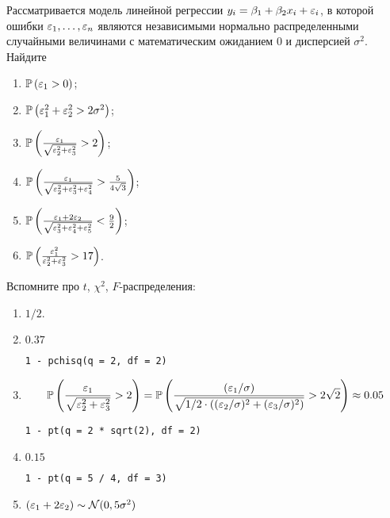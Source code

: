 \begin{problem}
Рассматривается модель линейной регрессии $y_i = \beta_1 + \beta_2 x_i + \varepsilon_i$, в которой ошибки $\varepsilon_1, \ldots, \varepsilon_n$ являются независимыми нормально распределенными случайными величинами с математическим ожиданием $0$ и дисперсией $\sigma^2$. Найдите

\begin{enumerate}
  \item $\mathbb{P}\left(\varepsilon_1 > 0\right)$;
  \item $\mathbb{P}\left(\varepsilon_1^2 + \varepsilon_2^2 > 2\sigma^2\right)$;
  \item $\mathbb{P}\left(\frac{\varepsilon_1}{\sqrt{\varepsilon_2^2 + \varepsilon_3^2}} > 2 \right)$;
  \item $\mathbb{P}\left(\frac{\varepsilon_1}{\sqrt{\varepsilon_2^2 + \varepsilon_3^2 + \varepsilon_4^2}} > \frac{5}{4\sqrt{3}} \right)$;
  \item $\mathbb{P}\left(\frac{\varepsilon_1 + 2\varepsilon_2}{\sqrt{\varepsilon_3^2 + \varepsilon_4^2 + \varepsilon_5^2}} < \frac{9}{2} \right)$;
  \item $\mathbb{P}\left(\frac{\varepsilon_1^2}{\varepsilon_2^2 + \varepsilon_3^2} > 17 \right)$.
\end{enumerate}


\begin{sol}
Вспомните про $t$, $\chi^2$, $F$-распределения:
\begin{enumerate}
\item \(1/2\).
\item $0.37$


\begin{verbatim}
1 - pchisq(q = 2, df = 2)
\end{verbatim}
\item \[\mathbb{P}\left(\frac{\varepsilon_1}{\sqrt{\varepsilon_2^2 + \varepsilon_3^2}} > 2 \right) =  \mathbb{P}\left(\frac{(\varepsilon_1/\sigma)}{\sqrt{1/2 \cdot \left((\varepsilon_2/\sigma)^2 + (\varepsilon_3/\sigma)^2\right)}} > 2\sqrt{2} \right) \approx 0.05
\]

\begin{verbatim}
1 - pt(q = 2 * sqrt(2), df = 2)
\end{verbatim}
\item $0.15$

\begin{verbatim}
1 - pt(q = 5 / 4, df = 3)
\end{verbatim}
\item \(\left(\varepsilon_1 + 2\varepsilon_2\right) \sim \mathcal{N}(0, 5\sigma^2)  \)


\end{enumerate}
\end{sol}
\end{problem}
